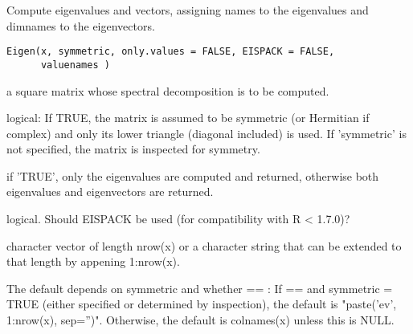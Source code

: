 \documentclass{article}
\begin{document}
\begin{Description}\relax
Compute eigenvalues and vectors, assigning names to the eigenvalues
and dimnames to the eigenvectors.
\end{Description}
\begin{Usage}
\begin{verbatim}
Eigen(x, symmetric, only.values = FALSE, EISPACK = FALSE,
      valuenames )
\end{verbatim}
\end{Usage}
\begin{Arguments}
\begin{ldescription}
\item[\code{x}] a square matrix whose spectral decomposition is to be computed.  

\item[\code{symmetric}] logical:  If TRUE, the matrix is assumed to be symmetric (or 
Hermitian if complex) and only its lower triangle (diagonal
included) is used.  If 'symmetric' is not specified, the
matrix is inspected for symmetry.

\item[\code{only.values}] if 'TRUE', only the eigenvalues are computed and returned, otherwise
both eigenvalues and eigenvectors are returned. 

\item[\code{EISPACK}] logical. Should EISPACK be used (for compatibility with R < 1.7.0)?

\item[\code{valuenames}] character vector of length nrow(x) or a character string that can be
extended to that length by appening 1:nrow(x).

The default depends on symmetric and whether
 == :  If
 ==  and
symmetric = TRUE (either specified or determined by
inspection), the default is "paste('ev', 1:nrow(x), sep='')".
Otherwise, the default is colnames(x) unless this is NULL. 

\end{ldescription}
\end{Arguments}
\end{document}
